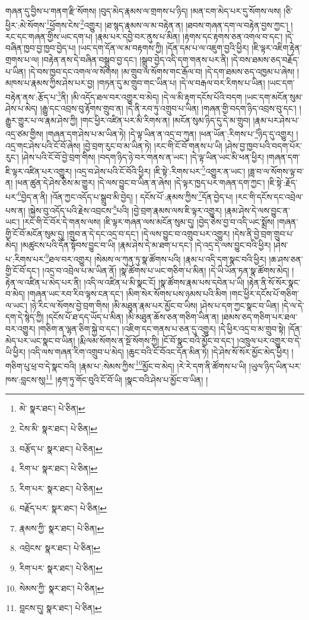 གཞན་དུ་བྱིས་པ་གནག་རྫི་སོགས། །བུད་མེད་རྣམས་ལ་གྲགས་པ་ཉིད། །མན་ངག་མེད་པར་དུ་སོགས་ལས། །ཅི་ཕྱིར་:མེ་སོགས་\footnote{མེ་  སྣར་ཐང་།  པེ་ཅིན། }ཕྱོགས་ངེས་\footnote{ངེས་མི་  སྣར་ཐང་།  པེ་ཅིན། }འགྱུར། །ཐ་སྙད་རྣམས་ལ་མ་བརྟེན་ན། །ཐབས་གཞན་དག་ལ་བརྟེན་བྱས་ཀྱང་། །རང་དང་གཞན་གྱིས་ཡང་དག་པ། །རྣམ་པར་དབྱེ་བར་ནུས་པ་མིན། །རྟགས་དང་རྟགས་ཅན་འགལ་བ་དང་། །དེ་བཞིན་ཁྱབ་བྱ་ཁྱབ་བྱེད་པ། །ཡང་དག་དོན་ལ་མ་བརྟགས་ཀྱི། །དོན་དམ་པ་ལ་འཇུག་བྱའི་ཕྱིར། །ཇི་ལྟར་འཇིག་རྟེན་གྲགས་པ་ལ། །བརྟེན་ནས་དེ་བཞིན་བསྒྲུབ་བྱ་དང་། །སྒྲུབ་བྱེད་འདི་དག་གནས་པར་ནི། །དེ་བས་ཐམས་ཅད་བརྗོད་པ་ཡིན། །དེ་བས་ཁྱབ་དང་འགལ་ལ་སོགས། །མ་གྲུབ་ལ་སོགས་གང་རྒོལ་བ། །དེ་དག་ཐམས་ཅད་འཁྱམ་པ་ཞེས། །མཁས་པ་རྣམས་ཀྱིས་ཤེས་པར་བྱ། །གཏན་དུ་མ་གྲུབ་གང་ཡིན་པ། །དེ་ལ་བརྒལ་བར་རིགས་པ་ཡིན། །ཡང་དག་བརྟེན་ནས་:རྩོད་པ་\footnote{བརྩོད་པ་  སྣར་ཐང་།  པེ་ཅིན། }ནི། །མི་འདོད་ཐལ་བར་འགྱུར་བ་མེད། །དེ་ལ་མི་རྟག་དངོས་པོའི་བདག །ཡང་དག་མངོན་སུམ་ཤེས་པ་མེད། །རྒྱུ་དང་འབྲས་བུ་རྟོགས་གྲུབ་ན། །དེ་ནི་རབ་ཏུ་འགྲུབ་པ་ཡིན། །གཞན་གྱི་བདག་ཉིད་འབྲས་བུ་དང་། །རྒྱུར་གྱུར་པ་ལ་རྣམ་ཤེས་ཀྱི། །གང་ཕྱིར་འཛིན་པར་མི་རིགས་ན། །མངོན་སུམ་ཉིད་དུ་དེ་མ་གྲུབ། །རྣམ་པར་ཤེས་པ་འདྲ་ཙམ་གྱིས། །གཞན་དག་ཤེས་པ་མ་ཡིན་ཏེ། །དེ་ལྟ་ཡིན་ན་འདྲ་བ་ཀུན། །ཕན་ཡོན་:རིགས་པ་\footnote{རིག་པ་  སྣར་ཐང་།  པེ་ཅིན། }ཉིད་དུ་འགྱུར། །འདྲ་གང་ཤེས་པའི་ངོ་བོ་ཞེས། །བྱེ་བྲག་རུང་བ་མ་ཡིན་ཏེ། །རང་གི་ངོ་བོ་གནས་པ་ཡི། །ཤེས་བྱ་ཁྱབ་པའི་བདག་པོར་རུང་། །ཤེས་པའི་ངོ་བོ་བྱེ་བྲག་གིས། །བདག་ཉིད་ཉེ་བར་གནས་ན་ཡང་། །དེ་ལྟ་ཡིན་ཡང་མི་ཕན་ཕྱིར། །གཞན་དག་ཇི་ལྟར་འཛིན་པར་འགྱུར། །འདྲ་བ་ཤེས་པའི་ངོ་བོའི་ཕྱིར། །ཇི་སྟེ་:རིགས་པར་\footnote{རིག་པར་  སྣར་ཐང་།  པེ་ཅིན། }འགྱུར་ན་ཡང་། །ཟླ་བ་ལ་སོགས་ལྟ་བ་ན། །ཕན་ཚུན་དེ་ཤེས་ཅིས་མ་གྱུར། །དེ་ལས་བྱུང་བ་ཡིན་ན་ཞེས། །དེ་ལྟར་ཁྱད་པར་གཞན་དག་ཀྱང་། །ཇི་སྟེ་:རྗོད་པར་\footnote{བརྗོད་པར་  སྣར་ཐང་།  པེ་ཅིན། }བྱེད་ན་ནི། །འོན་ཀྱང་འདོད་པ་སྒྲུབ་མི་བྱེད། །
དངོས་པོ་:རྣམས་ཀྱིས་\footnote{རྣམས་ཀྱི་  སྣར་ཐང་།  པེ་ཅིན། }དོན་བྱེད་པ། །རང་གི་དངོས་དང་འབྲེལ་པས་ན། །སྐྱེས་བུ་འདོད་པའི་རྗེས་འབྲངས་\footnote{འབྲེངས་  སྣར་ཐང་།  པེ་ཅིན། }པའི། །བྱེ་བྲག་རྣམས་ལས་ཇི་ལྟར་འགྱུར། །རྣམ་ཤེས་དེ་ལས་བྱུང་ན་ཡང་། །རང་གི་ངོ་བོར་དེ་གནས་ལས། །ཇི་ལྟར་གཞན་ལས་མངོན་སུམ་དུ། །བྱེད་ཅེས་བྱ་བ་འདི་ཡང་སྨྲོས། །གཞན་གྱི་ངོ་བོ་མངོན་སུམ་དུ། །གྲུབ་ན་དེ་དང་འདྲ་བ་དང་། །དེ་ལས་བྱུང་བ་འགྲུབ་པར་འགྱུར། །དེས་ནི་བྱེ་བྲག་གྲུབ་པ་མེད། །མཚུངས་པའི་དོན་སྟོབས་བྱུང་བ་ཡི། །རྣམ་ཤེས་དེ་མ་ཐག་པ་དང་། །དེ་འདྲ་དེ་ལས་བྱུང་བའི་ཕྱིར། །ཤེས་པ་:རིགས་པར་\footnote{རིག་པར་  སྣར་ཐང་།  པེ་ཅིན། }ཐལ་བར་འགྱུར། །སེམས་ལ་ཀུན་ཏུ་སྣ་ཚོགས་པའི། །རྣམ་པ་འདི་དག་སྣང་བའི་ཕྱིར། །ཆ་ཤས་ཅན་གྱི་ངོ་བོ་དང་། །འདྲ་བ་འབྲེལ་པ་མ་ཡིན་ནོ། །སྣ་ཚོགས་པ་ཡང་གཅིག་པ་མིན། །དེ་ཡི་ཡོན་ཏན་སྣ་ཚོགས་མེད། །རྟེན་ལ་འཛིན་པ་མེད་པར་ནི། །འདི་ལ་འཛིན་པ་མི་སྣང་ངོ། །སྣ་ཚོགས་རྣམ་པས་དབེན་པ་ཡི། །རྟེན་ནི་སོ་སོར་སྣང་བ་མེད། །གཞན་ཡང་རབ་རིབ་ལྟས་ངན་དང་། །མིག་སེར་སོགས་པས་ཉམས་པའི་མིག །གང་ཕྱིར་དངོས་པོ་གཅིག་ལ་ཡང་། །ཉེ་རིང་ལ་སོགས་བྱེ་བྲག་གིས། །མི་མཐུན་རྣམ་པར་མྱོང་བ་ཡིས། །ཤེས་པ་དག་ཀྱང་སྣང་བ་ཡིན། །དེ་ལ་དེ་དག་དེ་སྙེད་ཀྱི། །དངོས་པོ་ཐ་དད་ཡོད་པ་མིན། །མི་མཐུན་ཆོས་ཅན་གཅིག་ཡིན་ན། །ཐམས་ཅད་གཅིག་པར་ཐལ་བར་འགྱུར། །གཅིག་ན་ལྷན་ཅིག་སྐྱེ་བ་དང་། །འཇིག་དང་གནས་པ་ཅན་དུ་འགྱུར། །དེ་ཕྱིར་འདྲ་བ་མ་གྲུབ་སྟེ། །དོན་མེད་པར་ཡང་སྣང་བ་ཡིན། །རྨི་ལམ་སོགས་ན་སྔོ་སོགས་ཀྱི། །ངོ་བོ་སྣང་བའི་མྱོང་བ་དང་། །འཁྲུལ་པར་འགྱུར་བ་དེ་ཡི་ཕྱིར། །འདི་ལས་གཞན་རིག་འགྲུབ་པ་མེད། །ཆུང་བའི་ངོ་བོའང་དོན་མིན་ཏེ། །དེ་ཤེས་སོ་སོར་མྱོང་མེད་ཕྱིར། །གཅིག་པུ་ཕྲ་བ་དེ་སྣང་བའི། །རྣམ་པ་:སེམས་ཀྱིས་\footnote{སེམས་ཀྱི་  སྣར་ཐང་།  པེ་ཅིན། }མྱོང་བ་མེད། །རེ་རེ་དག་ནི་ཚོགས་པ་ཡི། །ཡུལ་ཉིད་ཡིན་པར་ཁས་:བླངས་སུ།\footnote{བླངས་དུ།  སྣར་ཐང་།  པེ་ཅིན། } །རྟག་ཏུ་གོང་བུའི་ངོ་བོ་ཡི། །སྣང་བའི་ཤེས་པ་མྱོང་བ་ཡིན། །
